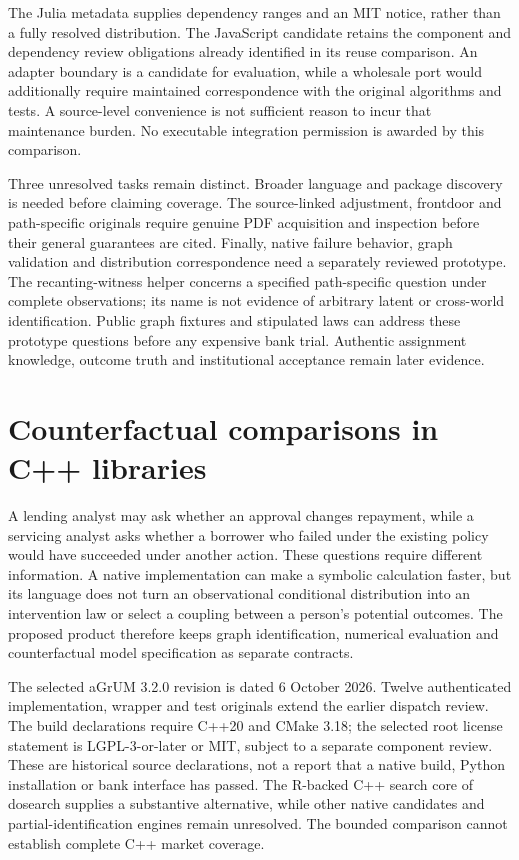 The Julia metadata supplies dependency ranges and an MIT notice, rather than
a fully resolved distribution. The JavaScript candidate retains the component
and dependency review obligations already identified in its reuse comparison.
An adapter boundary is a candidate for evaluation, while a wholesale port
would additionally require maintained correspondence with the original
algorithms and tests. A source-level convenience is not sufficient reason to
incur that maintenance burden. No executable integration permission is awarded
by this comparison.~\citep{exec19_otherid_julia,exec19_otherid_dagitty}

Three unresolved tasks remain distinct. Broader language and package discovery
is needed before claiming coverage. The source-linked adjustment, frontdoor
and path-specific originals require genuine PDF acquisition and inspection
before their general guarantees are cited. Finally, native failure behavior,
graph validation and distribution correspondence need a separately reviewed
prototype. The recanting-witness helper concerns a specified path-specific
question under complete observations; its name is not evidence of arbitrary
latent or cross-world identification. Public graph fixtures and stipulated
laws can address these prototype questions before any expensive bank trial.
Authentic assignment knowledge, outcome truth and institutional acceptance
remain later evidence.~\citep{exec19_otherid_julia,exec19_otherid_dagitty,exec19_otherid_reference}


\section{Counterfactual comparisons in C++ libraries}
\label{exec19:cxxid-scope}
A lending analyst may ask whether an approval changes repayment, while a
servicing analyst asks whether a borrower who failed under the existing policy
would have succeeded under another action. These questions require different
information. A native implementation can make a symbolic calculation faster,
but its language does not turn an observational conditional distribution into
an intervention law or select a coupling between a person's potential outcomes.
The proposed product therefore keeps graph identification, numerical evaluation
and counterfactual model specification as separate contracts.

The selected aGrUM 3.2.0 revision is dated 6 October 2026. Twelve authenticated
implementation, wrapper and test originals extend the earlier dispatch review.
The build declarations require C++20 and CMake 3.18; the selected root license
statement is LGPL-3-or-later or MIT, subject to a separate component review.
These are historical source declarations, not a report that a native build,
Python installation or bank interface has passed. The R-backed C++ search core
of dosearch supplies a substantive alternative, while other native candidates
and partial-identification engines remain unresolved. The bounded comparison
cannot establish complete C++ market coverage.
\citep{exec19_cxx_identification_source,exec18_rid_dosearch}

